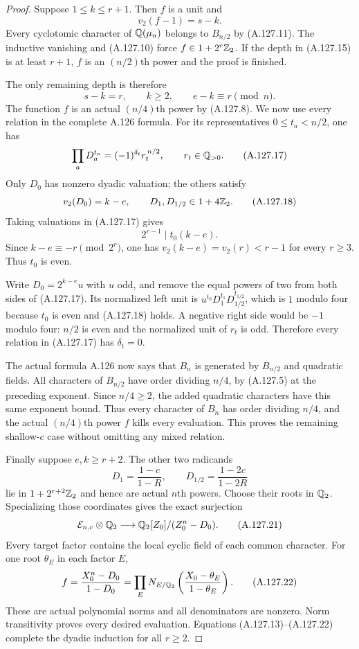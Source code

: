 \begin{proof}
Suppose $1\le k\le r+1$.
Then $f$ is a unit and
\[
                       v_2(f-1)=s-k.
\tag{A.127.15}
\]
Every cyclotomic character of $\mathbb Q(\mu_n)$ belongs
to $B_{n/2}$ by (A.127.11).
The inductive vanishing and (A.127.10) force
$f\in1+2^r\mathbb Z_2$.
If the depth in (A.127.15) is at least $r+1$,
$f$ is an $(n/2)$th power and the proof is finished.

The only remaining depth is therefore
\[
                s-k=r,\qquad k\ge2,\qquad
                        e-k\equiv r\pmod n.
\tag{A.127.16}
\]
The function $f$ is an actual $(n/4)$th power
by (A.127.8).
We now use every relation in the complete
A.126 formula.
For its representatives $0\le t_a<n/2$, one has
\[
 \prod_aD_a^{t_a}=(-1)^{\delta_t}r_t^{\,n/2},
             \qquad r_t\in\mathbb Q_{>0}.
\tag{A.127.17}
\]
Only $D_0$ has nonzero dyadic valuation; the
others satisfy
\[
 v_2(D_0)=k-e,\qquad
 D_1,D_{1/2}\in1+4\mathbb Z_2.
\tag{A.127.18}
\]
Taking valuations in (A.127.17) gives
\[
              2^{r-1}\mid t_0(k-e).
\tag{A.127.19}
\]
Since $k-e\equiv-r\pmod{2^r}$, one has
$v_2(k-e)=v_2(r)<r-1$ for every $r\ge3$.
Thus $t_0$ is even.

Write $D_0=2^{k-e}u$ with $u$ odd, and remove
the equal powers of two from both sides of
(A.127.17).
Its normalized left unit is
$u^{t_0}D_1^{t_1}D_{1/2}^{t_{1/2}}$, which is
$1$ modulo four because $t_0$ is even and
(A.127.18) holds.
A negative right side would be $-1$ modulo
four: $n/2$ is even and the normalized unit
of $r_t$ is odd.
Therefore every relation in (A.127.17) has
$\delta_t=0$.

The actual formula A.126 now says that $B_n$
is generated by $B_{n/2}$ and quadratic fields.
All characters of $B_{n/2}$ have order dividing
$n/4$, by (A.127.5) at the preceding exponent.
Since $n/4\ge2$, the added quadratic characters
have this same exponent bound.
Thus every character of $B_n$ has order dividing
$n/4$, and the actual $(n/4)$th power $f$ kills
every evaluation.
This proves the remaining shallow-$c$ case
without omitting any mixed relation.

Finally suppose $e,k\ge r+2$.
The other two radicands
\[
              D_1=\frac{1-c}{1-R},\qquad
              D_{1/2}=\frac{1-2c}{1-2R}
\tag{A.127.20}
\]
lie in $1+2^{r+2}\mathbb Z_2$ and hence are actual
$n$th powers.
Choose their roots in $\mathbb Q_2$.
Specializing those coordinates gives the exact
surjection
\[
     \mathcal E_{n,c}\otimes\mathbb Q_2
                  \longrightarrow\mathbb Q_2[Z_0]/(Z_0^n-D_0).
\tag{A.127.21}
\]
Every target factor contains the local cyclic
field of each common character.
For one root $\theta_E$ in each factor $E$,
\[
       f=\frac{X_0^n-D_0}{1-D_0}
         =\prod_E N_{E/\mathbb Q_2}
                    \left(\frac{X_0-\theta_E}{1-\theta_E}\right).
\tag{A.127.22}
\]
These are actual polynomial norms and all
denominators are nonzero.
Norm transitivity proves every desired
evaluation.
Equations (A.127.13)--(A.127.22) complete the
dyadic induction for all $r\ge2$.


\end{proof}
